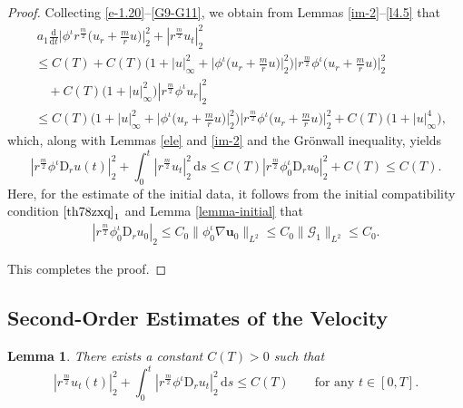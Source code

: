 \documentclass[11pt,reqno]{amsart}
\newtheorem{lem}{Lemma}[section]
\numberwithin{rk}{section}
\numberwithin{prop}{section}
\numberwithin{mydef}{section}
\numberwithin{lem}{section}
\numberwithin{equation}{section}
\numberwithin{thm}{section}
\begin{document}
\begin{proof}
Collecting \eqref{e-1.20}--\eqref{G9-G11}, we obtain 
from Lemmas \ref{im-2}--\ref{l4.5} that
\begin{equation}\label{e-1.23}
\begin{aligned}
&\,a_1\frac{\mathrm{d}}{\mathrm{d}t}\Big|\phi^{\iota}r^\frac{m}{2}\big(u_r+\frac{m}{r}u\big)\Big|_2^2+|r^{\frac{m}{2}}u_t|_2^2\\
&\leq C(T)+C(T)\Big(1+|u|_\infty^2+\Big|\phi^\iota\big(u_r+\frac{m}{r}u\big)\Big|_2^2\Big)\Big|r^\frac{m}{2}\phi^\iota\big(u_r+\frac{m}{r}u\big)\Big|_2^2\\
&\quad +C(T)\big(1+|u|_\infty^2\big)|r^\frac{m}{2}\phi^{\iota}u_r|_2^2\\
&\leq  C(T)\Big(1+|u|_\infty^2+\Big|\phi^\iota\big(u_r+\frac{m}{r}u\big)\Big|_2^2\Big)\Big|r^\frac{m}{2}\phi^\iota\big(u_r+\frac{m}{r}u\big)\Big|_2^2 + C(T)\big(1+|u|_\infty^4\big) ,
\end{aligned}
\end{equation}
which, along with Lemmas \ref{ele} and \ref{im-2} and the Gr\"onwall inequality, yields
\begin{equation}\label{eg}
|r^{\frac{m}{2}}\phi^\iota\mathrm{D}_r u(t)|_2^2+\int_0^t  |r^{\frac{m}{2}}u_t|_2^2\,\mathrm{d}s\leq C(T) |r^{\frac{m}{2}}\phi_0^\iota\mathrm{D}_r u_0|_2^2+C(T)\leq C(T).  
\end{equation}
Here, for the estimate of the initial data, it follows from the initial compatibility condition $\eqref{th78zxq}_1$ and Lemma \ref{lemma-initial} that
\begin{equation}
\begin{aligned}
|r^{\frac{m}{2}}\phi_0^\iota\mathrm{D}_r u_0|_2\leq C_0\|\phi_0^\iota\nabla\boldsymbol{u}_0\|_{L^2}\leq C_0\|\mathcal{G}_1\|_{L^2}\leq C_0.
\end{aligned}
\end{equation}


This completes the proof. 
\end{proof}


\subsection{Second-Order Estimates of the Velocity}
\begin{lem}\label{l4.8}
There exists a constant $C(T)>0$ such that
\begin{equation*}
|r^{\frac{m}{2}}u_t(t)|^2_2+\int_0^t |r^{\frac{m}{2}}\phi^\iota\mathrm{D}_r u_t|_2^2 \,\mathrm{d}s \leq C(T)
\qquad \text{for any $t\in[0,T]$}.
\end{equation*}
\end{lem}
 
\end{document}
